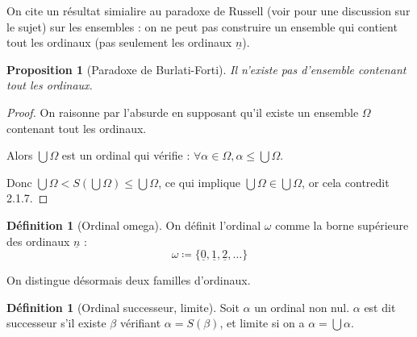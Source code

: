 \documentclass{article}
\theoremstyle{definition}
\newtheorem{definition}[subsubsection]{Définition}
\theoremstyle{plain}
\newtheorem{proposition}[subsubsection]{Proposition}
\theoremstyle{plain}
\theoremstyle{plain}
\theoremstyle{plain}
\begin{document}
\par On cite un résultat simialire au paradoxe de Russell (voir \cite{dumoncel2002philosophie} pour une discussion sur le sujet) sur les ensembles : on ne peut pas construire un ensemble qui contient tout les ordinaux (pas seulement les ordinaux \( \underline{n} \)).
\begin{proposition}[Paradoxe de Burlati-Forti]
	Il n'existe pas d'ensemble contenant tout les ordinaux.
\end{proposition}
\begin{proof}
	On raisonne par l'absurde en supposant qu'il existe un ensemble \( \Omega \) contenant tout les ordinaux.
	
	Alors \( \bigcup \Omega \) est un ordinal qui vérifie : \( \forall \alpha \in \Omega, \alpha \le \bigcup \Omega \). 

	Donc \( \bigcup\Omega < S(\bigcup\Omega) \le \bigcup\Omega \), ce qui implique \( \bigcup\Omega \in \bigcup\Omega \), or cela contredit 2.1.7.
\end{proof}\begin{definition}[Ordinal omega]
	On définit l'ordinal \( \omega \) comme la borne supérieure des ordinaux \( \underline{n} \) :
\begin{equation*}
	\omega \coloneqq \{\underline{0}, \underline{1}, \underline{2}, \ldots\}
\end{equation*}	
\end{definition}

\par On distingue désormais deux familles d'ordinaux.
\begin{definition}[Ordinal successeur, limite]
	Soit \( \alpha \) un ordinal non nul. \( \alpha \) est dit successeur s'il existe \( \beta \) vérifiant \( \alpha = S(\beta) \), et limite si on a \( \alpha = \bigcup \alpha \).
\end{definition}
\end{document}
